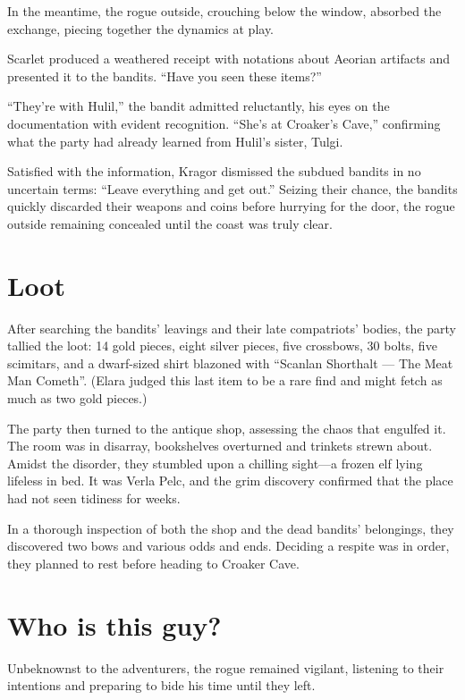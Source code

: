 \documentclass[
  letterpaper,12pt,twoside,twocolumn,openany,
  nodeprecatedcode,bg=full]{dndbook}
\begin{document}
In the meantime, the rogue outside, crouching below the window, absorbed
the exchange, piecing together the dynamics at play.

Scarlet produced a weathered receipt with notations about Aeorian
artifacts and presented it to the bandits. ``Have you seen these
items?''

``They're with Hulil,'' the bandit admitted reluctantly, his eyes on the
documentation with evident recognition. ``She's at Croaker's Cave,''
confirming what the party had already learned from Hulil's sister,
Tulgi.

Satisfied with the information, Kragor dismissed the subdued bandits in
no uncertain terms: ``Leave everything and get out.'' Seizing their
chance, the bandits quickly discarded their weapons and coins before
hurrying for the door, the rogue outside remaining concealed until the
coast was truly clear.

\section{Loot}\label{loot}

After searching the bandits' leavings and their late compatriots'
bodies, the party tallied the loot: 14 gold pieces, eight silver pieces,
five crossbows, 30 bolts, five scimitars, and a dwarf-sized shirt
blazoned with ``Scanlan Shorthalt --- The Meat Man Cometh''. (Elara
judged this last item to be a rare find and might fetch as much as two
gold pieces.)

The party then turned to the antique shop, assessing the chaos that
engulfed it. The room was in disarray, bookshelves overturned and
trinkets strewn about. Amidst the disorder, they stumbled upon a
chilling sight---a frozen elf lying lifeless in bed. It was Verla Pelc,
and the grim discovery confirmed that the place had not seen tidiness
for weeks.

In a thorough inspection of both the shop and the dead bandits'
belongings, they discovered two bows and various odds and ends. Deciding
a respite was in order, they planned to rest before heading to Croaker
Cave.

\section{Who is this guy?}\label{who-is-this-guy}

Unbeknownst to the adventurers, the rogue remained vigilant, listening
to their intentions and preparing to bide his time until they left.
\end{document}
